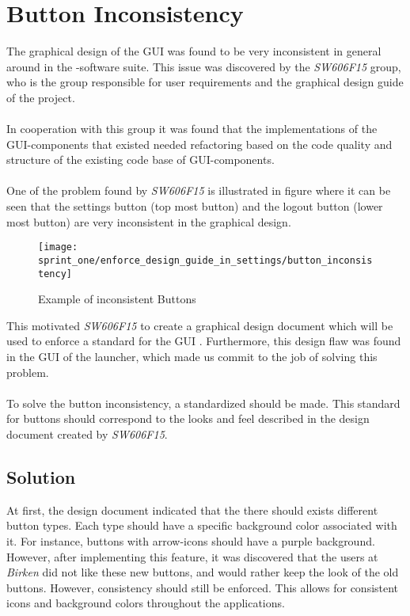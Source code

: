 \section{Button Inconsistency}
\label{sub:button_inconsistency}

The graphical design of the GUI was found to be very inconsistent in general around in the \giraf-software suite. This issue was discovered by the \emph{SW606F15} group, who is the group responsible for user requirements and the graphical design guide of the project.
\\\\
In cooperation with this group it was found that the implementations of the GUI-components that existed needed refactoring based on the code quality and structure of the existing code base of GUI-components.
\\\\
One of the problem found by \emph{SW606F15} is illustrated in figure  where it can be seen that the settings button (top most button) and the logout button (lower most button) are very inconsistent in the graphical design. 

\begin{figure}[!htbp]
    \centering
    \texttt{[image: sprint\_one/enforce\_design\_guide\_in\_settings/button\_inconsistency]}
    \caption{Example of inconsistent Buttons}
    \label{fig:button_inconsistency}
\end{figure}

This motivated \emph{SW606F15} to create a graphical design document which will be used to enforce a standard for the GUI . Furthermore, this design flaw was found in the GUI of the launcher, which made us commit to the job of solving this problem. 
\\\\
To solve the button inconsistency, a standardized should be made. This standard for buttons should correspond to the looks and feel described in the design document created by \emph{SW606F15}. 

\subsection{Solution}
\label{sub:solution}

At first, the design document indicated that the there should exists different button types. Each type should have a specific background color associated with it. For instance, buttons with arrow-icons should have a purple background. However, after implementing this feature, it was discovered that the users at \emph{Birken} did not like these new buttons, and would rather keep the look of the old buttons. However, consistency should still be enforced. This allows for consistent icons and background colors throughout the applications. 

